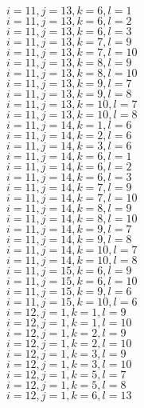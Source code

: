 \documentclass[14pt]{article}
\begin{document}
    $i=11,j=13,k=6,l=1 $ \\ 
    $i=11,j=13,k=6,l=2 $ \\ 
    $i=11,j=13,k=6,l=3 $ \\ 
    $i=11,j=13,k=7,l=9 $ \\ 
    $i=11,j=13,k=7,l=10 $ \\ 
    $i=11,j=13,k=8,l=9 $ \\ 
    $i=11,j=13,k=8,l=10 $ \\ 
    $i=11,j=13,k=9,l=7 $ \\ 
    $i=11,j=13,k=9,l=8 $ \\ 
    $i=11,j=13,k=10,l=7 $ \\ 
    $i=11,j=13,k=10,l=8 $ \\ 
    $i=11,j=14,k=1,l=6 $ \\ 
    $i=11,j=14,k=2,l=6 $ \\ 
    $i=11,j=14,k=3,l=6 $ \\ 
    $i=11,j=14,k=6,l=1 $ \\ 
    $i=11,j=14,k=6,l=2 $ \\ 
    $i=11,j=14,k=6,l=3 $ \\ 
    $i=11,j=14,k=7,l=9 $ \\ 
    $i=11,j=14,k=7,l=10 $ \\ 
    $i=11,j=14,k=8,l=9 $ \\ 
    $i=11,j=14,k=8,l=10 $ \\ 
    $i=11,j=14,k=9,l=7 $ \\ 
    $i=11,j=14,k=9,l=8 $ \\ 
    $i=11,j=14,k=10,l=7 $ \\ 
    $i=11,j=14,k=10,l=8 $ \\ 
    $i=11,j=15,k=6,l=9 $ \\ 
    $i=11,j=15,k=6,l=10 $ \\ 
    $i=11,j=15,k=9,l=6 $ \\ 
    $i=11,j=15,k=10,l=6 $ \\ 
    $i=12,j=1,k=1,l=9 $ \\ 
    $i=12,j=1,k=1,l=10 $ \\ 
    $i=12,j=1,k=2,l=9 $ \\ 
    $i=12,j=1,k=2,l=10 $ \\ 
    $i=12,j=1,k=3,l=9 $ \\ 
    $i=12,j=1,k=3,l=10 $ \\ 
    $i=12,j=1,k=5,l=7 $ \\ 
    $i=12,j=1,k=5,l=8 $ \\ 
    $i=12,j=1,k=6,l=13 $ \\ 
\end{document}
